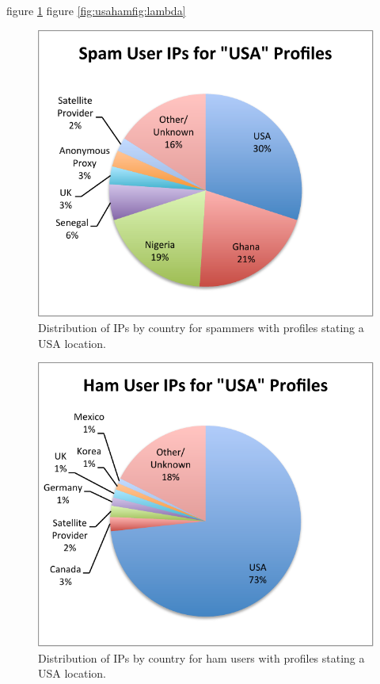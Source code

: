 \documentclass[preprint]{acm_proc_article-sp}
\begin{document}
figure \ref{fig:usaspam}
figure \ref{fig:usahamfig:lambda}
\begin{figure}[h]
    \centering
    \includegraphics[width=\linewidth]{figures/ips-usa-spam.pdf}
    \caption{Distribution of IPs by country for spammers with profiles stating a USA location.}
    \label{fig:usaspam}
\end{figure}


\begin{figure}[h]
    \centering
    \includegraphics[width=\linewidth]{figures/ips-usa-ham.pdf}
    \caption{Distribution of IPs by country for ham users with profiles stating a USA location.}
    \label{fig:usaham}
\end{figure}
\end{document}
